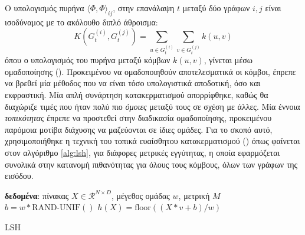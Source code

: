 Ο υπολογισμός πυρήνα $\langle \Phi, \Phi \rangle_{ij}$, στην επανάλαψη $t$ μεταξύ δύο γράφων $i, j$ είναι ισοδύναμος με το ακόλουθο διπλό άθροισμα:
\begin{equation}
    K(G^{(i)}_{t}, G^{(j)}_{t}) = \sum_{u \in G^{(i)}_{t}} \sum_{v \in G^{(j)}_{t}} k(u, v)
\end{equation}
όπου ο υπολογισμός του πυρήνα μεταξύ κόμβων $k(u, v)$, γίνεται μέσω ομαδοποίησης ().
Προκειμένου να ομαδοποιηθούν αποτελεσματικά οι κόμβοι, έπρεπε να βρεθεί μία μέθοδος που να είναι τόσο υπολογιστικά αποδοτική, όσο και εκφραστική.
Μία απλή συνάρτηση κατακερματισμού απορρίφθηκε, καθώς θα διαχώριζε τιμές που ήταν πολύ πιο \textit{όμοιες} μεταξύ τους σε σχέση με άλλες.
Μία έννοια \textit{τοπικότητας} έπρεπε να προστεθεί στην διαδικασία ομαδοποίησης, προκειμένου παρόμοια μοτίβα διάχυσης να μαζεύονται σε ίδιες ομάδες.
Για το σκοπό αυτό, χρησιμοποιήθηκε η τεχνική του τοπικά ευαίσθητου κατακερματισμού () όπως φαίνεται στον αλγόριθμο \ref{alg:lsh}, για διάφορες μετρικές εγγύτητας, η οποία εφαρμόζεται συνολικά στην κατανομή πιθανότητας για όλους τους κόμβους, όλων των γράφων της εισόδου.
\begin{algorithm}[]
\textbf{δεδομένα}: πίνακας $X \in \mathcal{R}^{N \times D}$, μέγεθος ομάδας $w$, μετρική $M$\\
$b = w*\text{RAND-UNIF}()$ 
$h(X) = \text{floor}((X*v + b)/w)$ 
\caption{ LSH}
\label{alg:lsh}
\end{algorithm}

